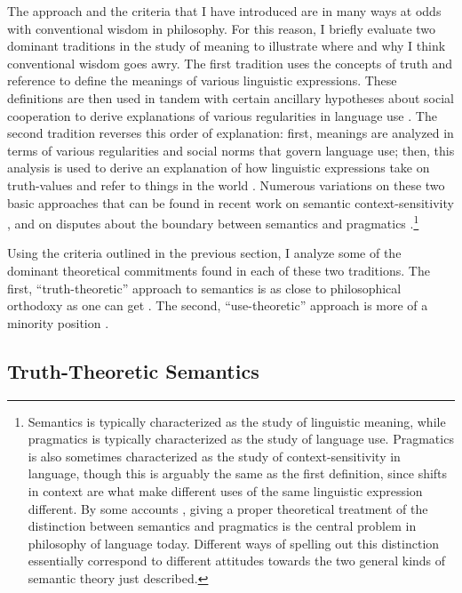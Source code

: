 The approach and the criteria that I have introduced are in many ways at odds with conventional wisdom in philosophy. For this reason, I briefly evaluate two dominant traditions in the study of meaning to illustrate where and why I think conventional wisdom goes awry. The first tradition uses the concepts of truth and reference to define the meanings of various linguistic expressions. These definitions are then used in tandem with certain ancillary hypotheses about social cooperation to derive explanations of various regularities in language use \citep[e.g.,][]{Soames:2010,Lewis:1970,Lewis:1975,Davidson:1967,CappelenLepore:2005,Grice:1975}. The second tradition reverses this order of explanation: first, meanings are analyzed in terms of various regularities and social norms that govern language use; then, this analysis is used to derive an explanation of how linguistic expressions take on truth-values and refer to things in the world \citep[e.g.,][]{Wittgenstein:1953,Brandom:1994,Brandom:2000,Horwich:2005}. Numerous variations on these two basic approaches that can be found in recent work on semantic context-sensitivity \citep{Recanati:2004,CappelenLepore:2005}, and on disputes about the boundary between semantics and pragmatics \citep{Brandom:2000,Recanati:2012}.\footnote{Semantics is typically characterized as the study of linguistic meaning, while pragmatics is typically characterized as the study of language use. Pragmatics is also sometimes characterized as the study of context-sensitivity in language, though this is arguably the same as the first definition, since shifts in context are what make different uses of the same linguistic expression different. By some accounts \citep[e.g.,][]{CappelenLepore:2005}, giving a proper theoretical treatment of the distinction between semantics and pragmatics is the central problem in philosophy of language today. Different ways of spelling out this distinction essentially correspond to different attitudes towards the two general kinds of semantic theory just described.}

Using the criteria outlined in the previous section, I analyze some of the dominant theoretical commitments found in each of these two traditions. The first, ``truth-theoretic'' approach to semantics is as close to philosophical orthodoxy as one can get \citep{Speaks:2014}. The second, ``use-theoretic'' approach is more of a minority position \citep{Stanley:2008,Brandom:1994,Brandom:2000}.

\subsection{Truth-Theoretic Semantics}


